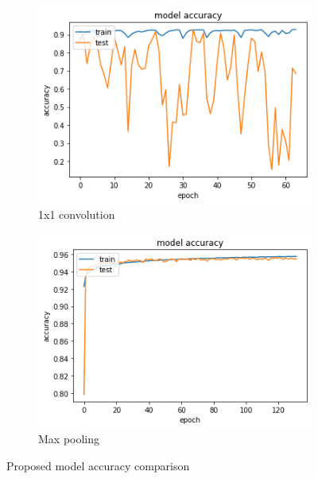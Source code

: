 \documentclass{article}
\begin{document}
\begin{figure}[H]
	\centering
	\begin{subfigure}{.5\textwidth}
		\centering
		\includegraphics[width=.95\linewidth]{./images/poly/new model_acc.png}
		\caption{1x1 convolution}
	\end{subfigure}%
	\begin{subfigure}{.5\textwidth}
		\centering
		\includegraphics[width=.95\linewidth]{./images/poly/new model_acc_new.png}
		\caption{Max pooling}
	\end{subfigure}
	\caption{Proposed model accuracy comparison}
	\label{fig:poly_new_acc}
\end{figure}
\end{document}

